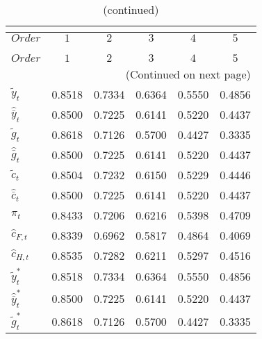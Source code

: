  
\begin{center}
\begin{longtable}{lccccc} 
\caption{COEFFICIENTS OF AUTOCORRELATION}\\
 \label{Table:th_autocorr_matrix}\\
\toprule 
$Order                $	 & 	 $         1$	 & 	 $         2$	 & 	 $         3$	 & 	 $         4$	 & 	 $         5$\\
\midrule \endfirsthead 
\caption{(continued)}\\
 \toprule \\ 
$Order                $	 & 	 $         1$	 & 	 $         2$	 & 	 $         3$	 & 	 $         4$	 & 	 $         5$\\
\midrule \endhead 
\midrule \multicolumn{6}{r}{(Continued on next page)} \\ \bottomrule \endfoot 
\bottomrule \endlastfoot 
${\tilde y_t}         $	 & 	    0.8518	 & 	    0.7334	 & 	    0.6364	 & 	    0.5550	 & 	    0.4856 \\ 
${\hat {\bar y}_t}    $	 & 	    0.8500	 & 	    0.7225	 & 	    0.6141	 & 	    0.5220	 & 	    0.4437 \\ 
${\tilde g_t}         $	 & 	    0.8618	 & 	    0.7126	 & 	    0.5700	 & 	    0.4427	 & 	    0.3335 \\ 
${\hat {\bar g}_t}    $	 & 	    0.8500	 & 	    0.7225	 & 	    0.6141	 & 	    0.5220	 & 	    0.4437 \\ 
${\tilde c_t}         $	 & 	    0.8504	 & 	    0.7232	 & 	    0.6150	 & 	    0.5229	 & 	    0.4446 \\ 
${\hat {\bar c}_t}    $	 & 	    0.8500	 & 	    0.7225	 & 	    0.6141	 & 	    0.5220	 & 	    0.4437 \\ 
${\pi_t}              $	 & 	    0.8433	 & 	    0.7206	 & 	    0.6216	 & 	    0.5398	 & 	    0.4709 \\ 
${\hat c_{F,t}}       $	 & 	    0.8339	 & 	    0.6962	 & 	    0.5817	 & 	    0.4864	 & 	    0.4069 \\ 
${\hat c_{H,t}}       $	 & 	    0.8535	 & 	    0.7282	 & 	    0.6211	 & 	    0.5297	 & 	    0.4516 \\ 
${\tilde y_t^*}       $	 & 	    0.8518	 & 	    0.7334	 & 	    0.6364	 & 	    0.5550	 & 	    0.4856 \\ 
${\hat {\bar y}_t^*}  $	 & 	    0.8500	 & 	    0.7225	 & 	    0.6141	 & 	    0.5220	 & 	    0.4437 \\ 
${\tilde g_t^*}       $	 & 	    0.8618	 & 	    0.7126	 & 	    0.5700	 & 	    0.4427	 & 	    0.3335 \\ 

\end{longtable}
\end{center}
